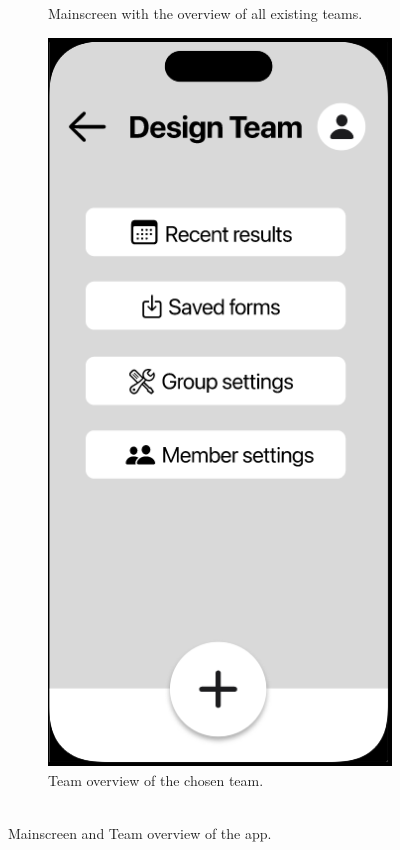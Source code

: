 \documentclass[11pt]{article}
\begin{document}
\begin{figure}
\begin{subfigure}[b]{0.4\textwidth}
         \caption{Mainscreen with the overview of all existing teams.}
         \label{fig:mainscreen}
     \end{subfigure}
     \hfill
     \begin{subfigure}[b]{0.4\textwidth}
         \centering
         \includegraphics[width=\textwidth]{figures/Team-Overview.PNG}
         \caption{Team overview of the chosen team.\\  \mbox{}\\}
         \label{fig:teamoverview}
     \end{subfigure}
        \caption{Mainscreen and Team overview of the app.}
\end{figure}
\end{document}
